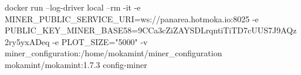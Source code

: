 \begin{shellcommandbox}\begin{ttlst}
docker run --log-driver local --rm -it -e MINER_PUBLIC_SERVICE_URI=ws://panarea.hotmoka.io:8025 -e PUBLIC_KEY_MINER_BASE58=9CCa3cZiZAYSDLrqntiTiTD7cUUS7J9AQz2ry5yxADeq -e PLOT_SIZE="5000" -v miner_configuration:/home/mokamint/miner_configuration mokamint/mokamint:1.7.3 config-miner
\end{ttlst}\end{shellcommandbox}
